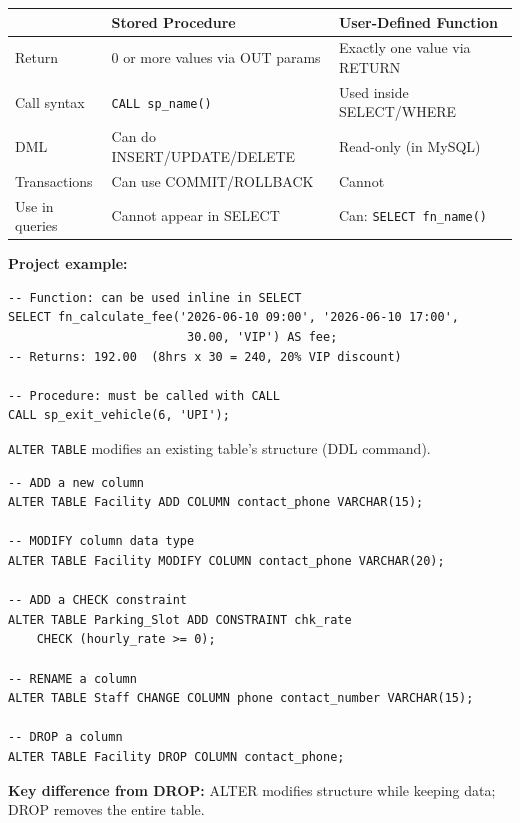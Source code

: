 \documentclass[12pt,a4paper]{article}
\begin{document}
\begin{questionbox}
\end{questionbox}
\begin{answerbox}
\begin{longtable}{@{}lp{5.5cm}p{5.5cm}@{}}
\toprule
& \textbf{Stored Procedure} & \textbf{User-Defined Function} \\
\midrule
Return & 0 or more values via OUT params & Exactly one value via RETURN \\
Call syntax & \texttt{CALL sp\_name()} & Used inside SELECT/WHERE \\
DML & Can do INSERT/UPDATE/DELETE & Read-only (in MySQL) \\
Transactions & Can use COMMIT/ROLLBACK & Cannot \\
Use in queries & Cannot appear in SELECT & Can: \texttt{SELECT fn\_name()} \\
\bottomrule
\end{longtable}

\textbf{Project example:}
\begin{lstlisting}
-- Function: can be used inline in SELECT
SELECT fn_calculate_fee('2026-06-10 09:00', '2026-06-10 17:00',
                         30.00, 'VIP') AS fee;
-- Returns: 192.00  (8hrs x 30 = 240, 20% VIP discount)

-- Procedure: must be called with CALL
CALL sp_exit_vehicle(6, 'UPI');
\end{lstlisting}
\end{answerbox}

\begin{questionbox}
\end{questionbox}
\begin{answerbox}
\texttt{ALTER TABLE} modifies an existing table's structure (DDL command).

\begin{lstlisting}
-- ADD a new column
ALTER TABLE Facility ADD COLUMN contact_phone VARCHAR(15);

-- MODIFY column data type
ALTER TABLE Facility MODIFY COLUMN contact_phone VARCHAR(20);

-- ADD a CHECK constraint
ALTER TABLE Parking_Slot ADD CONSTRAINT chk_rate
    CHECK (hourly_rate >= 0);

-- RENAME a column
ALTER TABLE Staff CHANGE COLUMN phone contact_number VARCHAR(15);

-- DROP a column
ALTER TABLE Facility DROP COLUMN contact_phone;
\end{lstlisting}

\textbf{Key difference from DROP:} ALTER modifies structure while keeping data; DROP removes the entire table.
\end{answerbox}
\end{document}
